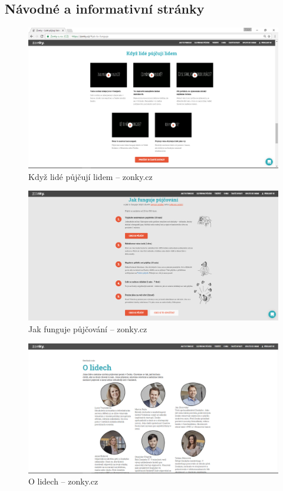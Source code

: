 
\newpage
\subsection{Návodné a informativní stránky}
\begin{figure}[h]
    \centering
    \includegraphics[width=1.0\textwidth]{media/zonky/info.png}
    \caption{Když lidé půjčují lidem -- zonky.cz}
    \label{fig:zonky:info}
\end{figure}
\begin{figure}[h]
    \centering
    \includegraphics[width=1.0\textwidth]{media/zonky/info2.png}
    \caption{Jak funguje půjčování -- zonky.cz}
    \label{fig:zonky:info2}
\end{figure}
\begin{figure}[h]
    \centering
    \includegraphics[width=1.0\textwidth]{media/zonky/info3.png}
    \caption{O lidech -- zonky.cz}
    \label{fig:zonky:info3}
\end{figure}
